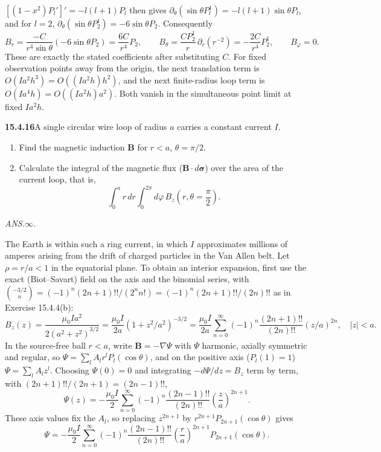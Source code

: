 $[(1-x^2)P_l']'=-l(l+1)P_l$ then gives
$\partial_\theta(\sin\theta P_l^1)=-l(l+1)\sin\theta P_l$, and for
$l=2$, $\partial_\theta(\sin\theta P_2^1)=-6\sin\theta P_2$.
Consequently
\[
B_r=\frac{-C}{r^4\sin\theta}(-6\sin\theta P_2)=\frac{6C}{r^4}P_2,\qquad
B_\theta=\frac{C P_2^1}r\,\partial_r(r^{-2})=-\frac{2C}{r^4}P_2^1,
\qquad B_\varphi=0.
\]
These are exactly the stated coefficients after substituting $C$.
For fixed observation points away from the origin, the next
translation term is $O(Ia^2h^3)=O((Ia^2h)h^2)$, and the next
finite-radius loop term is $O(Ia^4h)=O((Ia^2h)a^2)$.
Both vanish in the simultaneous point limit at fixed $Ia^2h$.

\par\bigskip
\noindent\textbf{15.4.16}\quad A single circular wire loop of radius
$a$ carries a constant current $I$.
\begin{enumerate}
\item[(a)] Find the magnetic induction $\mathbf{B}$ for $r<a$,
$\theta=\pi/2$.
\item[(b)] Calculate the integral of the magnetic flux
($\mathbf{B}\cdot d\boldsymbol{\sigma}$) over the area of the current
loop, that is,
\[
\int_{0}^{a}r\,dr\int_{0}^{2\pi}d\varphi\,
B_{z}\left(r,\theta=\frac{\pi}{2}\right).
\]
\end{enumerate}
\par\nobreak\hfill\emph{ANS.}\enspace$\infty$.
\par The Earth is within such a ring current, in which $I$
approximates millions of amperes arising from the drift of charged
particles in the Van Allen belt.
\solution
Let $\rho=r/a<1$ in the equatorial plane. To obtain an interior
expansion, first use the exact (Biot--Savart) field on the axis and
the binomial series, with
$\binom{-3/2}{n}=(-1)^n(2n+1)!!/(2^nn!)=(-1)^n(2n+1)!!/(2n)!!$ as in
Exercise 15.4.4(b):
\[
B_z(z)=\frac{\mu_0Ia^2}{2(a^2+z^2)^{3/2}}
=\frac{\mu_0I}{2a}(1+z^2/a^2)^{-3/2}
=\frac{\mu_0I}{2a}\sum_{n=0}^\infty
(-1)^n\frac{(2n+1)!!}{(2n)!!}(z/a)^{2n},\quad |z|<a.
\]
In the source-free ball $r<a$, write $\mathbf B=-\nabla\Psi$ with
$\Psi$ harmonic, axially symmetric and regular, so
$\Psi=\sum_lA_lr^lP_l(\cos\theta)$, and on the positive axis
($P_l(1)=1$) $\Psi=\sum_lA_lz^l$. Choosing $\Psi(0)=0$ and
integrating $-d\Psi/dz=B_z$ term by term, with
$(2n+1)!!/(2n+1)=(2n-1)!!$,
\[
\Psi(z)=-\frac{\mu_0I}{2}\sum_{n=0}^\infty
(-1)^n\frac{(2n-1)!!}{(2n)!!}\left(\frac za\right)^{2n+1}.
\]
These axis values fix the $A_l$, so replacing $z^{2n+1}$ by
$r^{2n+1}P_{2n+1}(\cos\theta)$ gives
\[
\Psi=-\frac{\mu_0I}{2}\sum_{n=0}^\infty
(-1)^n\frac{(2n-1)!!}{(2n)!!}
\left(\frac ra\right)^{2n+1}P_{2n+1}(\cos\theta).
\]

